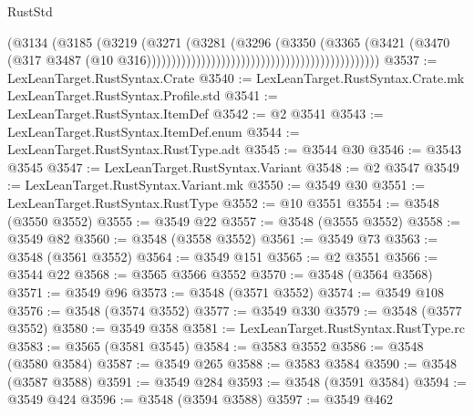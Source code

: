 \begin{lexlean}{RustStd}
\begin{coremodule}
                                                                          (@3134
                                                                            (@3185
                                                                              (@3219
                                                                                (@3271
                                                                                  (@3281
                                                                                    (@3296
                                                                                      (@3350
                                                                                        (@3365
                                                                                          (@3421
                                                                                            (@3470
                                                                                              (@317
                                                                                                @3487
                                                                                                (@10
                                                                                                  @316)))))))))))))))))))))))))))))))))))))))))))))))
@3537 := LexLeanTarget.RustSyntax.Crate
@3540 := LexLeanTarget.RustSyntax.Crate.mk LexLeanTarget.RustSyntax.Profile.std
@3541 := LexLeanTarget.RustSyntax.ItemDef
@3542 := @2 @3541
@3543 := LexLeanTarget.RustSyntax.ItemDef.enum
@3544 := LexLeanTarget.RustSyntax.RustType.adt
@3545 := @3544 @30
@3546 := @3543 @3545
@3547 := LexLeanTarget.RustSyntax.Variant
@3548 := @2 @3547
@3549 := LexLeanTarget.RustSyntax.Variant.mk
@3550 := @3549 @30
@3551 := LexLeanTarget.RustSyntax.RustType
@3552 := @10 @3551
@3554 := @3548 (@3550 @3552)
@3555 := @3549 @22
@3557 := @3548 (@3555 @3552)
@3558 := @3549 @82
@3560 := @3548 (@3558 @3552)
@3561 := @3549 @73
@3563 := @3548 (@3561 @3552)
@3564 := @3549 @151
@3565 := @2 @3551
@3566 := @3544 @22
@3568 := @3565 @3566 @3552
@3570 := @3548 (@3564 @3568)
@3571 := @3549 @96
@3573 := @3548 (@3571 @3552)
@3574 := @3549 @108
@3576 := @3548 (@3574 @3552)
@3577 := @3549 @330
@3579 := @3548 (@3577 @3552)
@3580 := @3549 @358
@3581 := LexLeanTarget.RustSyntax.RustType.rc
@3583 := @3565 (@3581 @3545)
@3584 := @3583 @3552
@3586 := @3548 (@3580 @3584)
@3587 := @3549 @265
@3588 := @3583 @3584
@3590 := @3548 (@3587 @3588)
@3591 := @3549 @284
@3593 := @3548 (@3591 @3584)
@3594 := @3549 @424
@3596 := @3548 (@3594 @3588)
@3597 := @3549 @462

\end{coremodule}
\end{lexlean}
